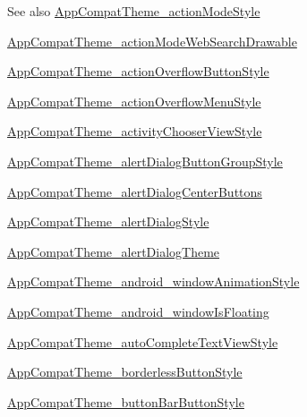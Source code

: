 \begin{DoxySeeAlso}{See also}
\hyperlink{classandroid_1_1support_1_1v4_1_1R_1_1styleable_a971a9ca17c81aa97a72178cc5f548ec6}{App\+Compat\+Theme\+\_\+action\+Mode\+Style} 

\hyperlink{classandroid_1_1support_1_1v4_1_1R_1_1styleable_a0f006cb9d33142dc621ea6ea9cd07941}{App\+Compat\+Theme\+\_\+action\+Mode\+Web\+Search\+Drawable} 

\hyperlink{classandroid_1_1support_1_1v4_1_1R_1_1styleable_a3d2d5375ec6b6f4b8c965c1a321d256a}{App\+Compat\+Theme\+\_\+action\+Overflow\+Button\+Style} 

\hyperlink{classandroid_1_1support_1_1v4_1_1R_1_1styleable_a409729e91a9f66ebb049d84ae7efa9cc}{App\+Compat\+Theme\+\_\+action\+Overflow\+Menu\+Style} 

\hyperlink{classandroid_1_1support_1_1v4_1_1R_1_1styleable_a52ee8fc4fb3df2bd060e60002e7c3fd2}{App\+Compat\+Theme\+\_\+activity\+Chooser\+View\+Style} 

\hyperlink{classandroid_1_1support_1_1v4_1_1R_1_1styleable_a14ef4f0115ef99be0cd37f57ee57210e}{App\+Compat\+Theme\+\_\+alert\+Dialog\+Button\+Group\+Style} 

\hyperlink{classandroid_1_1support_1_1v4_1_1R_1_1styleable_af89ac865778b38e2eee143370582e60a}{App\+Compat\+Theme\+\_\+alert\+Dialog\+Center\+Buttons} 

\hyperlink{classandroid_1_1support_1_1v4_1_1R_1_1styleable_a7ef5fa1da3e7689dcf99a6e3e7d47d88}{App\+Compat\+Theme\+\_\+alert\+Dialog\+Style} 

\hyperlink{classandroid_1_1support_1_1v4_1_1R_1_1styleable_acb7db297ea9150b5e0877e2de9f24603}{App\+Compat\+Theme\+\_\+alert\+Dialog\+Theme} 

\hyperlink{classandroid_1_1support_1_1v4_1_1R_1_1styleable_aecefaedc85497e957c68a6189e441d7c}{App\+Compat\+Theme\+\_\+android\+\_\+window\+Animation\+Style} 

\hyperlink{classandroid_1_1support_1_1v4_1_1R_1_1styleable_a27ce7dec7f28ef2ad9633dddcb3bb204}{App\+Compat\+Theme\+\_\+android\+\_\+window\+Is\+Floating} 

\hyperlink{classandroid_1_1support_1_1v4_1_1R_1_1styleable_a7aa1a2971f395765ecd403cc29ee5c95}{App\+Compat\+Theme\+\_\+auto\+Complete\+Text\+View\+Style} 

\hyperlink{classandroid_1_1support_1_1v4_1_1R_1_1styleable_a9ac1a4d55b1bb5250eb7fe7f9c455bfe}{App\+Compat\+Theme\+\_\+borderless\+Button\+Style} 

\hyperlink{classandroid_1_1support_1_1v4_1_1R_1_1styleable_ad50ccb52e962750a3efe3c9332b26ffc}{App\+Compat\+Theme\+\_\+button\+Bar\+Button\+Style} 


\end{DoxySeeAlso}
